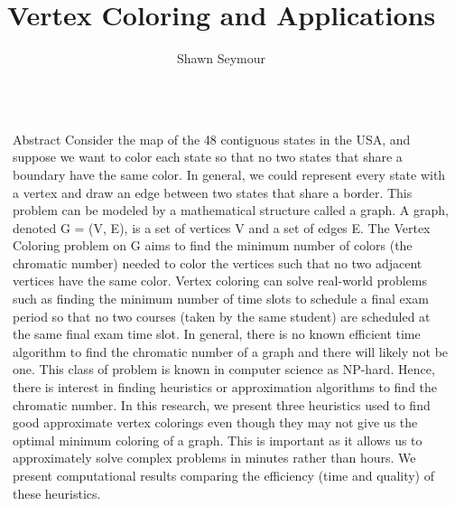 \documentclass[final]{beamer}
\title{Vertex Coloring and Applications}
\author{Shawn Seymour}
\institute{Advisor: Dr. Peh Ng}
\newlength{\sepwid}
\newlength{\onecolwid}
\begin{document}
\begin{frame}[t]
  \begin{columns}[t]												%
    \begin{column}{\sepwid}\end{column}			%
    \begin{column}{\onecolwid}
      \begin{block}{Abstract}
        \small
        Consider the map of the 48 contiguous states in the USA, and suppose we want to color each state so that no two states that share a boundary have the same color. In general, we could represent every state with a vertex and draw an edge between two states that share a border. This problem can be modeled by a mathematical structure called a graph. A graph, denoted G = (V, E), is a set of vertices V and a set of edges E. The Vertex Coloring problem on G aims to find the minimum number of colors (the chromatic number) needed to color the vertices such that no two adjacent vertices have the same color. Vertex coloring can solve real-world problems such as finding the minimum number of time slots to schedule a final exam period so that no two courses (taken by the same student) are scheduled at the same final exam time slot. In general, there is no known efficient time algorithm to find the chromatic number of a graph and there will likely not be one. This class of problem is known in computer science as NP-hard. Hence, there is interest in finding heuristics or approximation algorithms to find the chromatic number. In this research, we present three heuristics used to find good approximate vertex colorings even though they may not give us the optimal minimum coloring of a graph. This is important as it allows us to approximately solve complex problems in minutes rather than hours. We present computational results comparing the efficiency (time and quality) of these heuristics.


\end{block}
\end{column}
\end{columns}
\end{frame}
\end{document}
